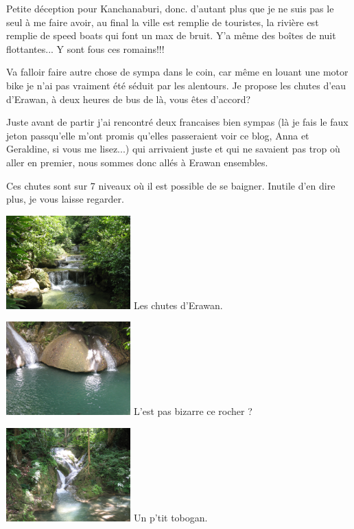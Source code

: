 \begin{multicols}{2}
Petite déception pour Kanchanaburi, donc. d'autant plus que je ne suis pas le seul à me faire avoir, au final la ville est remplie de touristes, la rivière est remplie de speed boats qui font un max de bruit. Y'a même des boîtes de nuit flottantes... Y sont fous ces romains!!!

Va falloir faire autre chose de sympa dans le coin, car même en louant une motor bike je n'ai pas vraiment été séduit par les alentours. Je propose les chutes d'eau d'Erawan, à deux heures de bus de là, vous êtes d'accord?

Juste avant de partir j'ai rencontré deux francaises bien sympas (là je fais le faux jeton passqu'elle m'ont promis qu'elles passeraient voir ce blog, Anna et Geraldine, si vous me lisez...) qui arrivaient juste et qui ne savaient pas trop où aller en premier, nous sommes donc allés à Erawan ensembles.

Ces chutes sont sur 7 niveaux où il est possible de se baigner. Inutile d'en dire plus, je vous laisse regarder.

\hspace*{-0.65cm}
\includegraphics[width=4.8cm]{articles/Kanchanaburi/1440.jpg}
Les chutes d'Erawan.

\hspace*{-0.65cm}
\includegraphics[width=4.8cm]{articles/Kanchanaburi/1439.jpg}
L'est pas bizarre ce rocher ?

\hspace*{-0.65cm}
\includegraphics[width=4.8cm]{articles/Kanchanaburi/1437.jpg}
Un p'tit tobogan.


\end{multicols}
